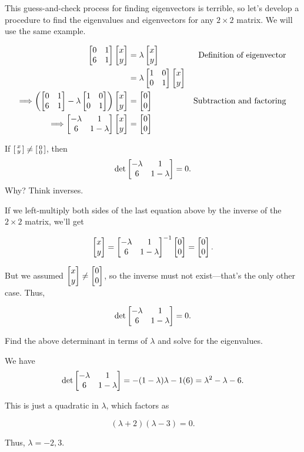 \documentclass[../gatm_answers.tex]{subfiles}
\begin{document}
\begin{outer_problem}
\item This guess-and-check process for finding eigenvectors is terrible, so let's develop a procedure to find the eigenvalues and eigenvectors for any $2\times 2$ matrix. We will use the same example.

\begin{align*}
\begin{bmatrix} 0 & 1 \\ 6 & 1 \end{bmatrix}\begin{bmatrix} x \\ y \end{bmatrix} &= \lambda\begin{bmatrix} x \\ y \end{bmatrix} & \text{Definition of eigenvector} \\
&= \lambda\begin{bmatrix} 1 & 0 \\ 0 & 1 \end{bmatrix}\begin{bmatrix} x \\ y \end{bmatrix} \\
\Longrightarrow \left(\begin{bmatrix} 0 & 1 \\ 6 & 1 \end{bmatrix}-\lambda\begin{bmatrix} 1 & 0 \\ 0 & 1 \end{bmatrix}\right)\begin{bmatrix} x \\ y \end{bmatrix}&=\begin{bmatrix} 0 \\ 0 \end{bmatrix} & \text{Subtraction and factoring} \\
\Longrightarrow \begin{bmatrix} -\lambda & 1 \\ 6 & 1-\lambda \end{bmatrix}\begin{bmatrix} x \\ y \end{bmatrix} &= \begin{bmatrix} 0 \\ 0 \end{bmatrix}
\end{align*}
\end{outer_problem}

\begin{inner_problem}[start=1]
\item If $\left[\begin{smallmatrix} x \\ y \end{smallmatrix}\right]\neq \left[\begin{smallmatrix} 0 \\ 0 \end{smallmatrix}\right]$, then $$\det \begin{bmatrix} -\lambda & 1 \\ 6 & 1-\lambda \end{bmatrix}=0.$$ Why? Think inverses.
\end{inner_problem}

If we left-multiply both sides of the last equation above by the inverse of the $2\times 2$ matrix, we'll get

$$\begin{bmatrix} x \\ y \end{bmatrix} = \begin{bmatrix} -\lambda & 1 \\ 6 & 1-\lambda \end{bmatrix}^{-1}\begin{bmatrix} 0 \\ 0 \end{bmatrix} = \begin{bmatrix} 0 \\ 0 \end{bmatrix}.$$

But we assumed $\begin{bmatrix} x \\ y \end{bmatrix} \neq \begin{bmatrix} 0 \\ 0 \end{bmatrix}$, so the inverse must not exist---that's the only other case. Thus,

$$\det \begin{bmatrix} -\lambda & 1 \\ 6 & 1-\lambda \end{bmatrix}=0.$$

\begin{inner_problem}
\item Find the above determinant in terms of $\lambda$ and solve for the eigenvalues.
\end{inner_problem}

We have $$\det \begin{bmatrix} -\lambda & 1 \\ 6 & 1-\lambda \end{bmatrix}=-(1-\lambda)\lambda-1(6)=\lambda^2 - \lambda - 6.$$

This is just a quadratic in $\lambda$, which factors as

$$(\lambda + 2)(\lambda - 3) = 0.$$

Thus, $\lambda = -2,3$.
\end{document}
